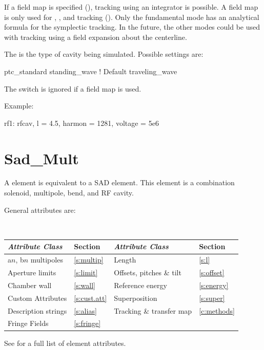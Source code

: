 {
If a field map is specified (), tracking using an
integrator is possible. A field map is only used for ,
,  and  tracking
().  Only the fundamental mode has an analytical formula
for the symplectic tracking. In the future, the other modes could be
used with  tracking using a field expansion about
the centerline.

The  is the type of cavity being simulated. Possible
settings are:
\begin{example}
  ptc_standard
  standing_wave    ! Default
  traveling_wave
\end{example}
The  switch is ignored if a field map is used.

Example:
\begin{example}
  rf1: rfcav, l = 4.5, harmon = 1281, voltage = 5e6
\end{example}

\section{Sad_Mult}
\label{s:sad.mult}

A  element is equivalent to a SAD\cite{b:sad} 
element. This element is a combination solenoid, multipole, bend, and
RF cavity.

General  attributes are:
\begin{center}
\tt
\begin{tabular}{llll} \toprule
  {\sl Attribute Class}      & Section           & {\sl Attribute Class}      & Section         \\ \midrule
  a$n$, b$n$ multipoles      & \ref{s:multip}    & Length                     & \ref{s:l}       \\
  Aperture limits            & \ref{s:limit}     & Offsets, pitches \& tilt   & \ref{s:offset}  \\
  Chamber wall               & \ref{s:wall}      & Reference energy           & \ref{s:energy}  \\ 
  Custom Attributes          & \ref{s:cust.att}  & Superposition              & \ref{s:super}   \\
  Description strings        & \ref{s:alias}     & Tracking \& transfer map   & \ref{c:methods} \\ 
  Fringe Fields              & \ref{s:fringe}    &                            &                 \\
  \bottomrule
\end{tabular}
\end{center}
\toffset
See  for a full list of element attributes.

}
